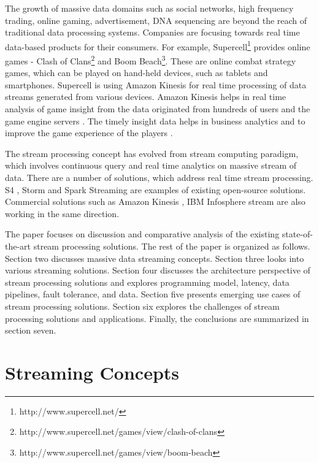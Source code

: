 \documentclass{acm_proc_article-sp}
\begin{document}
The growth of massive data domains such as social networks, high frequency trading, online gaming, advertisement, DNA sequencing are beyond the reach of traditional data processing systems. Companies are focusing towards real time data-based products for their consumers. For example, Supercell\footnote{http://www.supercell.net/} provides online games - Clash of Clans\footnote{http://www.supercell.net/games/view/clash-of-clans} and Boom Beach\footnote{http://www.supercell.net/games/view/boom-beach}. These are online combat strategy games,  which can be played on hand-held devices, such as tablets and smartphones. Supercell is using Amazon Kinesis \cite{Amazon:Kinesis:Main:Web} for real time processing of data streams generated from various devices. Amazon Kinesis helps in real time analysis of game insight from the  data originated from hundreds of users and the game engine servers \cite{AWS:Supercell}. The timely insight data helps in business analytics and to improve the game experience of the players \cite{AWS:Supercell}.  

The stream processing concept has evolved from stream computing paradigm, which involves continuous query and real time analytics on massive stream of data.  There are a number of solutions, which address real time stream processing.  S4 \cite{Neumeyer:2010:SDS:1933306.1934385}, Storm \cite{ApacheStorm} and Spark Streaming \cite{SparkStreaming:Online} are examples of existing open-source solutions.   Commercial solutions such as Amazon Kinesis \cite{Amazon:Kinesis:Main:Web}, IBM Infosphere stream \cite{IBM:Infosphere:Stream:WhitePaper} are also working in the same direction.

The paper focuses on discussion and comparative analysis of the existing state-of-the-art stream processing solutions. The rest of the paper is organized as follows. Section two discusses massive data streaming concepts. Section three looks into various streaming solutions. Section four discusses the architecture perspective of stream processing solutions and explores programming model, latency, data pipelines, fault tolerance, and data. Section five presents emerging use cases of stream processing solutions.  Section six explores the challenges of stream processing solutions and applications. Finally, the conclusions are summarized in section seven.




 
\section{Streaming Concepts}
\end{document}
